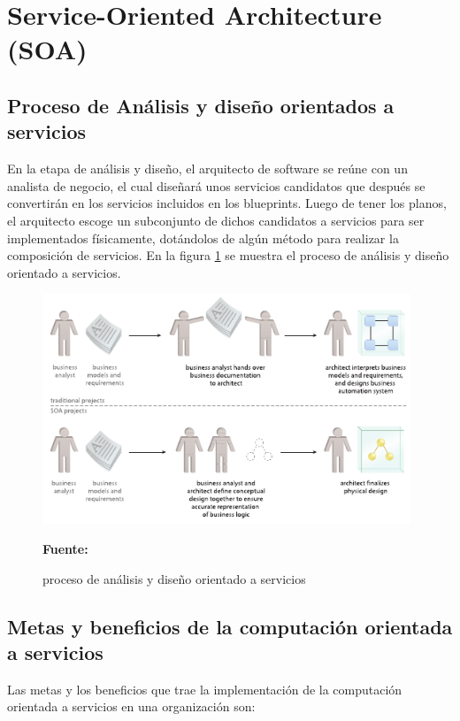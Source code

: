 \section{Service-Oriented Architecture (SOA)}
\subsection{Proceso de Análisis y diseño orientados a servicios}

En la etapa de análisis y diseño, el arquitecto de software se reúne con un analista de negocio, el cual diseñará unos servicios candidatos que después se convertirán en los servicios incluidos en los blueprints. Luego de tener los planos, el arquitecto escoge un subconjunto de dichos candidatos a servicios para ser implementados físicamente, dotándolos de algún método para realizar la composición de servicios. En la figura \ref{fig:seis} se muestra el proceso de análisis y diseño orientado a servicios.

\begin{figure}[!htb]
  \begin{center}
    \includegraphics[width=11cm]{./imagenes/6.png}
    \caption{proceso de análisis y diseño orientado a servicios}
    \label{fig:seis}
    \textbf{Fuente:}  \cite{soa_principles}
  \end{center}
\end{figure}

\subsection{Metas y beneficios de la computación orientada a servicios}

Las metas y los beneficios que trae la implementación de la computación orientada a servicios en una organización son:

